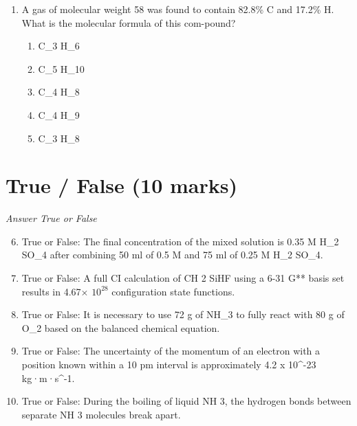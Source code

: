 \documentclass[12pt]{article}
\begin{document}
\begin{enumerate}[label=\arabic*.]
\begin{enumerate}[label=(\alph*)]
    \item 43 minutes
    \item 103 minutes
    \item 93 minutes
    \item 113 minutes
    \item 23 minutes
\end{enumerate}
\item A gas of molecular weight 58 was found to contain 82.8\% C and 17.2\% H. What is the molecular formula of this com-pound?
\begin{enumerate}[label=(\alph*)]
    \item C\_3 H\_6
    \item C\_5 H\_10
    \item C\_4 H\_8
    \item C\_4 H\_9
    \item C\_3 H\_8
\end{enumerate}
\end{enumerate}

\section*{True / False (10 marks)}
\textit{Answer True or False}
\begin{enumerate}[label=\arabic*.]
\setcounter{enumi}{5}
\item True or False: The final concentration of the mixed solution is 0.35 M H\_2 SO\_4 after combining 50 ml of 0.5 M and 75 ml of 0.25 M H\_2 SO\_4.
\item True or False: A full CI calculation of CH 2 SiHF using a 6-31 G** basis set results in 4.67\ensuremath{\times} $10^28$ configuration state functions.
\item True or False: It is necessary to use 72 g of NH\_3 to fully react with 80 g of O\_2 based on the balanced chemical equation.
\item True or False: The uncertainty of the momentum of an electron with a position known within a 10 pm interval is approximately 4.2 x 10^-23 kg·m·s^-1.
\item True or False: During the boiling of liquid NH 3, the hydrogen bonds between separate NH 3 molecules break apart.
\end{enumerate}
\end{document}
